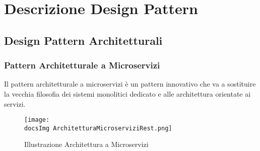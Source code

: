 \section{Descrizione Design Pattern}{
	\subsection{Design Pattern Architetturali}{
			\subsubsection{Pattern Architetturale a Microservizi}{
				Il pattern architetturale a microservizi è un pattern innovativo che va a sostituire la vecchia filosofia dei sistemi monolitici dedicato e alle architettura orientate ai servizi.
				
				\begin{figure}[H]
					\centering
					\texttt{[image: \\docsImg ArchitetturaMicroserviziRest.png]}
					\caption{Illustrazione Architettura a Microservizi}
					\label{Illustrazione Architettura a Microservizi}
				\end{figure}
			
}}}
